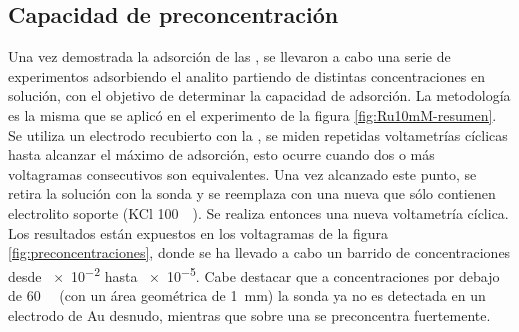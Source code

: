 	\subsection{Capacidad de preconcentración}

		Una vez demostrada la adsorción \ru\space de las \pdm, se llevaron a cabo una serie de experimentos adsorbiendo el analito partiendo de distintas concentraciones en solución, con el objetivo de determinar la capacidad de adsorción. La metodología es la misma que se aplicó en el experimento de la figura \ref{fig:Ru10mM-resumen}. Se utiliza un electrodo recubierto con la \pdmF\space, se miden repetidas voltametrías cíclicas hasta alcanzar el máximo de adsorción, esto ocurre cuando dos o más voltagramas consecutivos son equivalentes. Una vez alcanzado este punto, se retira la solución con la sonda y se reemplaza con una nueva que sólo contienen electrolito soporte (KCl \SI{100}{\milli\Molar}). Se realiza entonces una nueva voltametría cíclica. Los resultados están expuestos en los voltagramas de la figura \ref{fig:preconcentraciones}, donde se ha llevado a cabo un barrido de concentraciones desde \SI{e-2}{\Molar} hasta \SI{e-5}{\Molar}. Cabe destacar que a concentraciones por debajo de \SI{60}{\micro\Molar} (con un área geométrica de \SI{1}{mm}) la sonda ya no es detectada en un electrodo de Au desnudo, mientras que sobre una \pdm\space se preconcentra fuertemente.


